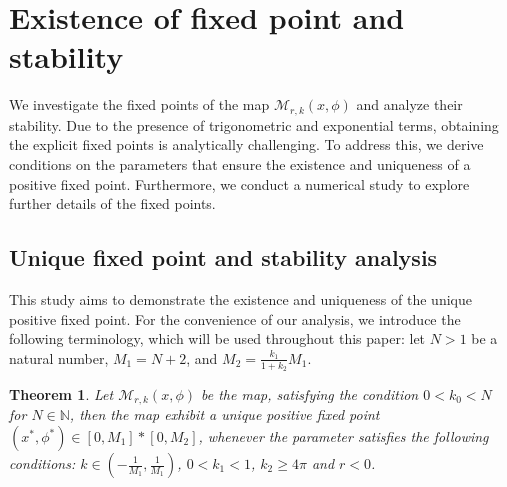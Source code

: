 \documentclass{article}
\newtheorem{theorem}{Theorem}[section]
\begin{document}
\section{Existence of fixed point and stability} We investigate the fixed points of the map $\mathcal{M}_{r,k}(x,\phi)$ and analyze their stability. Due to the presence of trigonometric and exponential terms, obtaining the explicit fixed points is analytically challenging. To address this, we derive conditions on the parameters that ensure the existence and uniqueness of a positive fixed point. Furthermore, we conduct a numerical study to explore further details of the fixed points. 

\subsection{Unique fixed point and stability analysis}\label{3.1}

This study aims to demonstrate the existence and uniqueness of the unique positive fixed point. For the convenience of our analysis, we introduce the following terminology, which will be used throughout this paper: let $N>1$ be a natural number, $M_1=N+2$, and $M_2=\frac{k_1}{1+k_2}M_1$.

\begin{theorem}
Let $\mathcal{M}_{r,k}(x,\phi)$ be the map, satisfying the condition $0<k_0<N$ for $N\in \mathbb{N}$, then the map exhibit a unique positive fixed point $(x^*,\phi^*)\in [0,M_1]*[0,M_2]$, whenever the parameter satisfies the following conditions: $k\in (-\frac{1}{M_1},\frac{1}{M_1})$, $0<k_1<1$, $k_2\geq4\pi$ and $r<0$.
\end{theorem}
\end{document}
